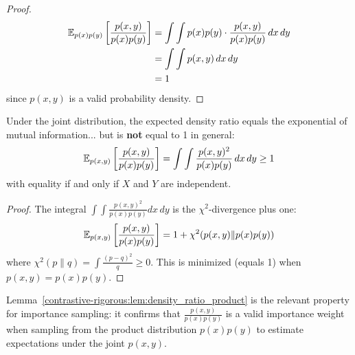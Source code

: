 \begin{notechapter}
\begin{proof}
\begin{align}
\mathbb{E}_{p(x)p(y)}\left[\frac{p(x,y)}{p(x)p(y)}\right] &= \int \int p(x)p(y) \cdot \frac{p(x,y)}{p(x)p(y)} \, dx \, dy \\
&= \int \int p(x,y) \, dx \, dy \\
&= 1
\end{align}
since $p(x,y)$ is a valid probability density.
\end{proof}

\begin{lemma}
\label{contrastive-rigorous:lem:density_ratio_joint}
Under the joint distribution, the expected density ratio equals the exponential of mutual information... but is \textbf{not} equal to 1 in general:
\begin{equation}
\mathbb{E}_{p(x,y)}\left[\frac{p(x,y)}{p(x)p(y)}\right] = \int \int \frac{p(x,y)^2}{p(x)p(y)} \, dx \, dy \geq 1
\end{equation}
with equality if and only if $X$ and $Y$ are independent.
\end{lemma}

\begin{proof}
The integral $\int \int \frac{p(x,y)^2}{p(x)p(y)} dx\, dy$ is the $\chi^2$-divergence plus one:
\begin{equation}
\mathbb{E}_{p(x,y)}\left[\frac{p(x,y)}{p(x)p(y)}\right] = 1 + \chi^2(p(x,y) \| p(x)p(y))
\end{equation}
where $\chi^2(p \| q) = \int \frac{(p-q)^2}{q} \geq 0$. This is minimized (equals 1) when $p(x,y) = p(x)p(y)$.
\end{proof}

\begin{remark}
Lemma~\ref{contrastive-rigorous:lem:density_ratio_product} is the relevant property for importance sampling: it confirms that $\frac{p(x,y)}{p(x)p(y)}$ is a valid importance weight when sampling from the product distribution $p(x)p(y)$ to estimate expectations under the joint $p(x,y)$.
\end{remark}
\end{notechapter}
